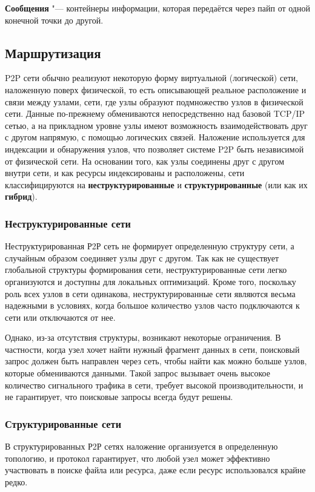 \documentclass[bachelor, och, coursework]{SCWorks}
\begin{document}
\textbf{Сообщения} "--- контейнеры информации, которая передаётся через пайп от одной конечной точки до другой.

\subsection{Маршрутизация}
P2P сети обычно реализуют некоторую форму виртуальной (логической) сети, наложенную поверх физической, то есть описывающей реальное расположение
и связи между узлами, сети, где узлы образуют подмножество узлов в физической сети. 
Данные по-прежнему обмениваются непосредственно над базовой TCP/IP сетью, 
а на прикладном уровне узлы имеют возможность взаимодействовать друг с другом напрямую, 
с помощью логических связей. Наложение используется для индексации и обнаружения узлов, 
что позволяет системе P2P быть независимой от физической сети. На основании того, как узлы соединены 
друг с другом внутри сети, и как ресурсы индексированы и расположены, сети классифицируются на 
\textbf{неструктурированные} и \textbf{структурированные} (или как их \textbf{гибрид}).

\subsubsection{Неструктурированные сети}
Неструктурированная Р2Р сеть не формирует определенную структуру сети, а случайным образом соединяет узлы друг с другом. 
Так как не существует глобальной структуры формирования сети, неструктурированные сети легко организуются и доступны для локальных оптимизаций. 
Кроме того, поскольку роль всех узлов в сети одинакова, неструктурированные сети являются весьма надежными в условиях, 
когда большое количество узлов часто подключаются к сети или отключаются от нее.

Однако, из-за отсутствия структуры, возникают некоторые ограничения. 
В частности, когда узел хочет найти нужный фрагмент данных в сети, поисковый запрос должен быть направлен через сеть, 
чтобы найти как можно больше узлов, которые обмениваются данными. Такой запрос вызывает очень высокое количество сигнального трафика в сети, 
требует высокой производительности, и не гарантирует, что поисковые запросы всегда будут решены.

\subsubsection{Структурированные сети}
В структурированных Р2Р сетях наложение организуется в определенную топологию, и протокол гарантирует, 
что любой узел может эффективно участвовать в поиске файла или ресурса, даже если ресурс использовался крайне редко.
\end{document}
